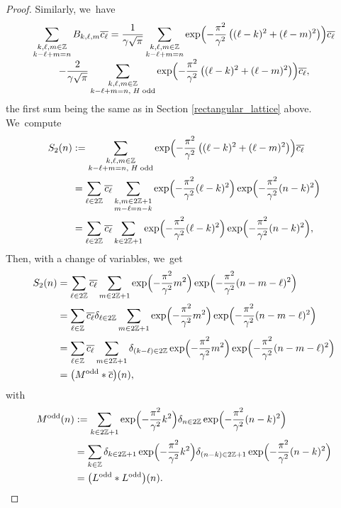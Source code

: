 \documentclass[10pt]{amsart}
\theoremstyle{definition}
\let\EE\exp
\let\ov\overline
\newcommand\Z{\mathbb Z}
\newcommand{\pa}[1]{\left(#1\right)}
\begin{document}
\begin{proof}
Similarly, we~have\vspace*{-5pt}
\begin{multline*}
\sum_{\substack {k, \ell, m \in \Z\\ k-\ell+m=n}}B_{k,\ell,m}\ov{c_{\ell}}
= \frac{1}{\gamma\sqrt{\pi}}\sum_{\substack { k, \ell, m \in \Z \\ k-\ell+m=n }}\EE\Bigl({-\frac{\pi^2}{\gamma^2}\pa{(\ell-k)^2+(\ell-m)^2}}\Bigr)\ov{c_{\ell}} \\[-3pt]
- \frac{2}{\gamma\sqrt{\pi}}\sum_{\substack { k, \ell, m \in \Z \\ k-\ell+m=n, \;H\; \text{odd}}}\EE\Bigl({-\frac{\pi^2}{\gamma^2}\pa{(\ell-k)^2+(\ell-m)^2}}\Bigr)\ov{c_{\ell}},
\end{multline*}
the first sum being the same as in Section \ref{rectangular_lattice} above. We~compute
\begin{align*}
S_2(n) &:= \sum_{\substack {k, \ell, m \in \Z \\ k-\ell+m=n, \; H\; \text{odd}}}\EE\Bigl({-\frac{\pi^2}{\gamma^2}\pa{(\ell-k)^2+(\ell-m)^2}}\Bigr)\ov{c_{\ell}} \\
&= \sum_{\ell\in 2\Z}\ov{c_{\ell}} \sum_{\substack {k, m \in 2\Z+1 \\ m-\ell = n-k}}\EE\Bigl({-\frac{\pi^2}{\gamma^2}(\ell-k)^2}\Bigr) \EE\Bigl({-\frac{\pi^2}{\gamma^2}(n-k)^2}\Bigr) \\
&= \sum_{\ell\in 2\Z}\ov{c_{\ell}} \sum_{k \in 2\Z+1}\EE\Bigl({-\frac{\pi^2}{\gamma^2}(\ell-k)^2}\Bigr) \EE\Bigl({-\frac{\pi^2}{\gamma^2}(n-k)^2} \Bigr),
\end{align*}
Then, with a change of variables, we~get
\begin{align*}
S_2 (n)&= \sum_{\ell\in 2\Z}\ov{c_{\ell}} \sum_{m \in 2\Z+1}\EE\Bigl({-\frac{\pi^2}{\gamma^2}m^2}\Bigr) \EE\Bigl({-\frac{\pi^2}{\gamma^2}(n-m-\ell)^2}\Bigr) \\
&= \sum_{\ell\in \Z}\ov{c_{\ell}}\delta_{\ell\in2\Z} \sum_{m \in 2\Z+1}\EE\Bigl({-\frac{\pi^2}{\gamma^2}m^2}\Bigr) \EE\Bigl({-\frac{\pi^2}{\gamma^2}(n-m-\ell)^2} \Bigr)\\
&= \sum_{\ell\in \Z}\ov{c_{\ell}} \sum_{m \in 2\Z+1}\delta_{(k-\ell)\in2\Z}\EE\Bigl({-\frac{\pi^2}{\gamma^2}m^2}\Bigr) \EE\Bigl({-\frac{\pi^2}{\gamma^2}(n-m-\ell)^2} \Bigr)\\
&=\bigl(M^{\text{odd}} * \ov{c}\bigr)(n),
\end{align*}
with
\begin{align}\label{defModd}
M^{\text{odd}}(n) &:=\sum_{k \in 2\Z+1} \EE\Bigl(-\frac{\pi^2}{\gamma^2}k^2\Bigr) \delta_{n\in2\Z}\EE\Bigl(-\frac{\pi^2}{\gamma^2}(n-k)^2\Bigr) \nonumber \\
&= \sum_{k \in \Z} \delta_{k\in2\Z+1}\EE\Bigl(-\frac{\pi^2}{\gamma^2}k^2\Bigr) \delta_{(n-k)\in2\Z+1}\EE\Bigl(-\frac{\pi^2}{\gamma^2}(n-k)^2\Bigr) \nonumber \\
&= \bigl(L^{\text{odd}} * L^{\text{odd}}\bigr) (n).
\end{align}


\end{proof}
\end{document}
